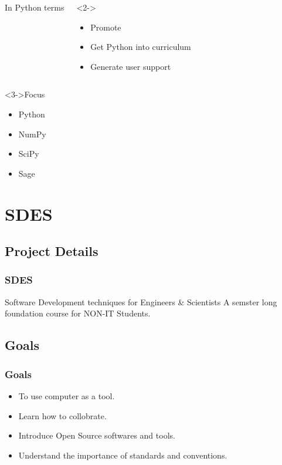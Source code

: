 \documentclass[compress,red]{beamer} %
\begin{document}
\begin{frame}
\begin{columns}
\begin{exampleblock}{}
In Python terms
\end{exampleblock}
\begin{exampleblock}<2->{}
\begin{itemize}
\item Promote 
\item Get Python into curriculum
\item Generate user support
\end{itemize}
\end{exampleblock}
\end{columns}
\begin{block}<3->{Focus}
\begin{itemize}
\item Python
\item NumPy
\item SciPy
\item Sage
\end{itemize}
\end{block}

\end{frame}



\section{SDES}
\subsection{Project Details}
\begin{frame}
\frametitle{SDES}
\begin{block}{Software Development techniques for Engineers \& Scientists}
A semster long foundation course for NON-IT Students.
\end{block}
\end{frame}

\subsection{Goals}
\begin{frame}
\frametitle{Goals}
\begin{itemize}
\item To use computer as a tool.
\item Learn how to collobrate.
\item Introduce Open Source softwares and tools.
\item Understand the importance of standards and conventions.
\end{itemize}
\end{frame}
\end{document}

